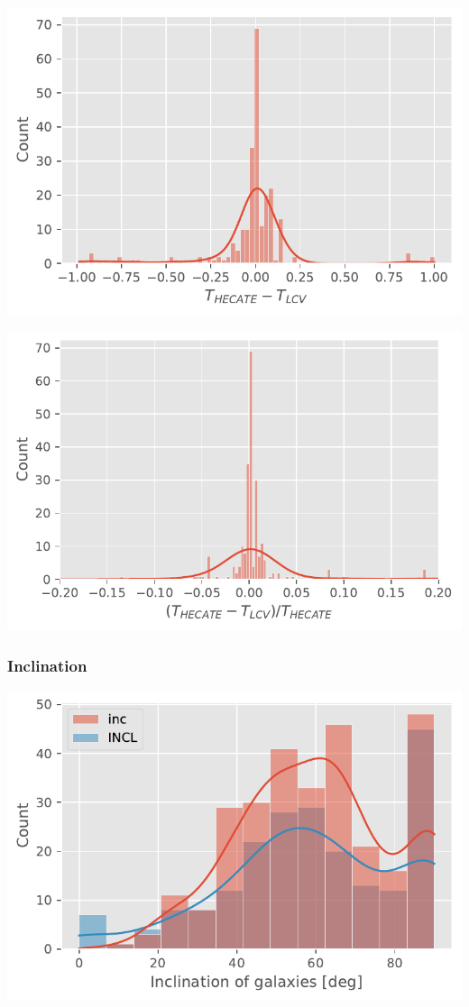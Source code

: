 \documentclass[
]{article}
\begin{document}
\includegraphics{compare_files/figure-pdf/cell-28-output-1.pdf}

\includegraphics{compare_files/figure-pdf/cell-29-output-1.pdf}

\subsubsection{Inclination}

\includegraphics{compare_files/figure-pdf/cell-30-output-1.pdf}
\end{document}
